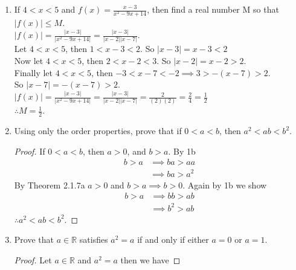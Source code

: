 \documentclass[12pt]{article}
\begin{document}
\begin{enumerate}
\begin{enumerate}
\begin{proof}
\begin{align*}
				            -ca+cb  & \in \mathbb{R}^+ &  & \text{(D)}                     \\
				            cb-ca   & \in \mathbb{R}^+ &  & \text{(A1)}                    \\
				            bc-ac   & \in \mathbb{R}^+ &  & \text{(M1)}                    \\
			            \end{align*}
			            so $bc > ac$ which is the same as $ac < bc$.
		            \end{proof}
	      \end{enumerate}
	      \pagebreak
	\item If $4 < x < 5$ and $f(x) = \frac{x-3}{x^2-9x+14}$, then find a real number M so that $|f(x)| \leq M$. \\
	      $|f(x)| = \frac{|x-3|}{|x^2-9x+14|} = \frac{|x-3|}{|x-2||x-7|}$.  \\
	      Let $4<x<5$, then $1 < x-3 < 2$. So $|x-3| = x-3 < 2$ \\
	      Now let $4 < x < 5$, then $2 < x-2 < 3$. So $|x-2| = x-2 > 2$. \\
	      Finally let $4 < x < 5$, then $-3 < x-7 < -2 \implies 3 > -(x-7) > 2$. \\
	      So $|x-7| = -(x-7) > 2$. \\
	      $|f(x)| = \frac{|x-3|}{|x^2-9x+14|} = \frac{|x-3|}{|x-2||x-7|} = \frac{2}{(2)(2)} = \frac{2}{4} = \frac{1}{2}$ \\
	      $\therefore M = \frac{1}{2}$.
	\item Using only the order properties, prove that if $ 0 < a < b$, then $a^2 < ab < b^2$.
	      \begin{proof} If $0 < a < b$, then $a > 0$, and $b > a$. By 1b
		      \begin{align*}
			      b > a & \implies ba > aa  \\
			            & \implies ba > a^2
		      \end{align*}
		      By Theorem 2.1.7a $a > 0$ and $b > a \implies b > 0$. Again by 1b we show
		      \begin{align*}
			      b > a & \implies bb > ab  \\
			            & \implies b^2 > ab
		      \end{align*}
		      $\therefore a^2 < ab < b^2$.
	      \end{proof}
	\item Prove that $a \in \mathbb{R}$ satisfies $a^2 = a$ if and only if either $a = 0$ or $a = 1$.
	      \begin{proof} Let $a \in \mathbb{R}$ and $a^2 = a$ then we have

\end{proof}
\end{enumerate}
\end{document}
